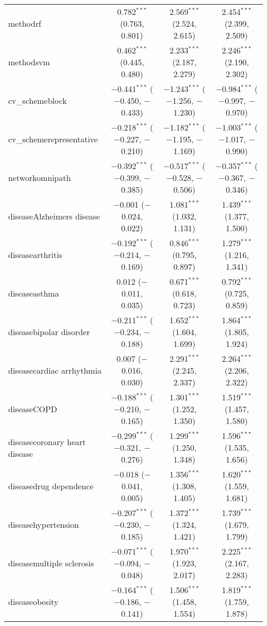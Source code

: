 \begin{table}[!htbp]
\begin{tabular}{@{\extracolsep{5pt}}lccc}
  methodrf & 0.782$^{***}$ (0.763, 0.801) & 2.569$^{***}$ (2.524, 2.615) & 2.454$^{***}$ (2.399, 2.509) \\ 
  methodsvm & 0.462$^{***}$ (0.445, 0.480) & 2.233$^{***}$ (2.187, 2.279) & 2.246$^{***}$ (2.190, 2.302) \\ 
  cv\_schemeblock & $-$0.441$^{***}$ ($-$0.450, $-$0.433) & $-$1.243$^{***}$ ($-$1.256, $-$1.230) & $-$0.984$^{***}$ ($-$0.997, $-$0.970) \\ 
  cv\_schemerepresentative & $-$0.218$^{***}$ ($-$0.227, $-$0.210) & $-$1.182$^{***}$ ($-$1.195, $-$1.169) & $-$1.003$^{***}$ ($-$1.017, $-$0.990) \\ 
  networkomnipath & $-$0.392$^{***}$ ($-$0.399, $-$0.385) & $-$0.517$^{***}$ ($-$0.528, $-$0.506) & $-$0.357$^{***}$ ($-$0.367, $-$0.346) \\ 
  diseaseAlzheimers disease & $-$0.001 ($-$0.024, 0.022) & 1.081$^{***}$ (1.032, 1.131) & 1.439$^{***}$ (1.377, 1.500) \\ 
  diseasearthritis & $-$0.192$^{***}$ ($-$0.214, $-$0.169) & 0.846$^{***}$ (0.795, 0.897) & 1.279$^{***}$ (1.216, 1.341) \\ 
  diseaseasthma & 0.012 ($-$0.011, 0.035) & 0.671$^{***}$ (0.618, 0.723) & 0.792$^{***}$ (0.725, 0.859) \\ 
  diseasebipolar disorder & $-$0.211$^{***}$ ($-$0.234, $-$0.188) & 1.652$^{***}$ (1.604, 1.699) & 1.864$^{***}$ (1.805, 1.924) \\ 
  diseasecardiac arrhythmia & 0.007 ($-$0.016, 0.030) & 2.291$^{***}$ (2.245, 2.337) & 2.264$^{***}$ (2.206, 2.322) \\ 
  diseaseCOPD & $-$0.188$^{***}$ ($-$0.210, $-$0.165) & 1.301$^{***}$ (1.252, 1.350) & 1.519$^{***}$ (1.457, 1.580) \\ 
  diseasecoronary heart disease & $-$0.299$^{***}$ ($-$0.321, $-$0.276) & 1.299$^{***}$ (1.250, 1.348) & 1.596$^{***}$ (1.535, 1.656) \\ 
  diseasedrug dependence & $-$0.018 ($-$0.041, 0.005) & 1.356$^{***}$ (1.308, 1.405) & 1.620$^{***}$ (1.559, 1.681) \\ 
  diseasehypertension & $-$0.207$^{***}$ ($-$0.230, $-$0.185) & 1.372$^{***}$ (1.324, 1.421) & 1.739$^{***}$ (1.679, 1.799) \\ 
  diseasemultiple sclerosis & $-$0.071$^{***}$ ($-$0.094, $-$0.048) & 1.970$^{***}$ (1.923, 2.017) & 2.225$^{***}$ (2.167, 2.283) \\ 
  diseaseobesity & $-$0.164$^{***}$ ($-$0.186, $-$0.141) & 1.506$^{***}$ (1.458, 1.554) & 1.819$^{***}$ (1.759, 1.878) \\ 

\end{tabular}
\end{table}
